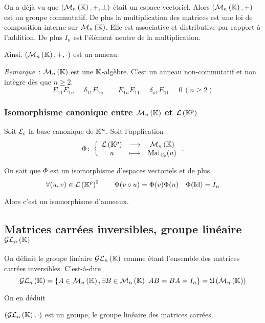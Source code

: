 On a déjà vu que \((\mathcal{M}_{n}\left(\mathbb{K}\right),+,\perp)\) était un espace vectoriel. Alors 
\((\mathcal{M}_{n}\left(\mathbb{K}\right),+)\) est un groupe commutatif. De plus la multiplication des 
matrices est une loi de composition interne sur \(\mathcal{M}_{n}\left(\mathbb{K}\right)\). Elle est 
associative et distributive par rapport à l'addition. De plus \(I_n\) est 
l'élément neutre de la multiplication.

Ainsi, \((\mathcal{M}_{n}\left(\mathbb{K}\right),+,\cdot)\) est un anneau.

\emph{Remarque}~: \(\mathcal{M}_{n}\left(\mathbb{K}\right)\) est une \(\mathbb{K}\)-algèbre. C'est un anneau 
non-commutatif et non intègre dès que \(n\geqslant 2\).
\begin{equation}
  E_{11}E_{1n}=\delta_{11}E_{1n} \qquad E_{1n}E_{11}=\delta_{n1}E_{11}=0 \, 
  (n\geqslant 2)
\end{equation}

\subsubsection{Isomorphisme canonique entre \(\mathcal{M}_{n}\left(\mathbb{K}\right)\) et \(\mathcal{L}\left(\mathbb{K}^p\right)\)}

Soit \(\mathcal{E}_c\) la base canonique de \(\mathbb{K}^n\). Soit l'application
\begin{equation}
  \Phi\colon \left\{\begin{array}{ccc} \mathcal{L}\left(\mathbb{K}^p\right) & \longrightarrow &\mathcal{M}_{n}\left(\mathbb{K}\right)\\ u & \longmapsto & \mathrm{Mat}_{\mathcal{E}_c}(u) \end{array} \right..
\end{equation}

On sait que \(\Phi\) est un isomorphisme d'espaces vectoriels et de plus
\begin{equation}
  \forall (u,v) \in \mathcal{L}\left(\mathbb{K}^p\right)^2 \qquad \Phi(v \circ u) =\Phi(v) \Phi(u) \quad 
  \Phi(\operatorname{Id})=I_n
\end{equation}

Alors c'est un isomorphisme d'anneaux.

\subsection{Matrices carrées inversibles, groupe linéaire \(\mathcal{GL}_{n}\left(\mathbb{K}\right)\)}

On définit le groupe linéaire \(\mathcal{GL}_{n}\left(\mathbb{K}\right)\) comme étant l'ensemble des 
matrices carrées inversibles. C'est-à-dire
\begin{equation}
  \GLn{n}{\K}=\{A \in \Mn{n}{\K}, \exists B \in \Mn{n}{\K} \ 
  AB=BA=I_n\}=\uinv{\Mn{n}{\K}}
\end{equation}

On en déduit
\begin{theo}
  \((\mathcal{GL}_{n}\left(\mathbb{K}\right),\cdot)\)  est un groupe, le groupe linéaire des matrices 
  carrées.
\end{theo}


